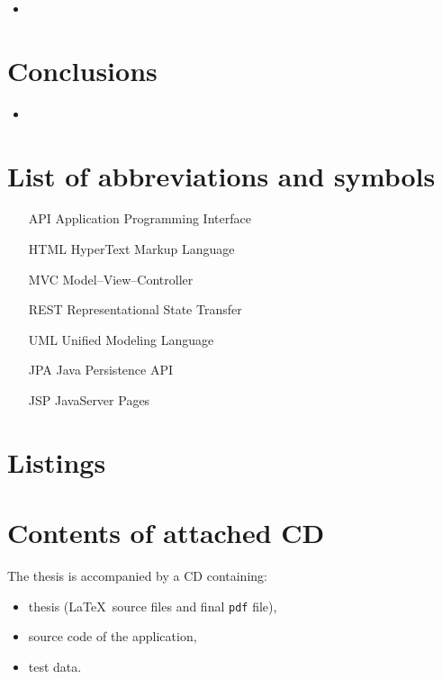 \documentclass[a4paper,twoside,12pt]{book}
\newcounter{PagesWithoutNumbers}
\begin{document}
\begin{itemize}
\item 
\end{itemize}

 
 
\chapter{Conclusions}

\begin{itemize}
\item 
\end{itemize}

 


\backmatter
{}
\setcounter{page}{\value{PagesWithoutNumbers}}

\pagestyle{onlyPageNumbers}





\begin{appendices} 

\chapter*{List of abbreviations and symbols}

\begin{itemize}
  \item[API] Application Programming Interface
  \item[HTML] HyperText Markup Language
  \item[MVC] Model--View--Controller 
  \item[REST] Representational State Transfer
  \item[UML] Unified Modeling Language
  \item[JPA] Java Persistence API
  \item[JSP] JavaServer Pages
\end{itemize}


\chapter*{Listings}

\chapter*{Contents of attached CD}

The thesis is accompanied by a CD containing:
\begin{itemize}
\item thesis (\LaTeX\ source files and final \texttt{pdf} file),
\item source code of the application,
\item test data.
\end{itemize}
 

\listoffigures
\listoftables
	
\end{appendices}
\end{document}
